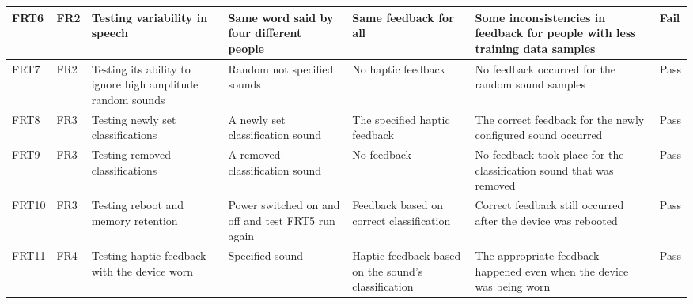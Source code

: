 \documentclass[12pt, titlepage]{article}
\begin{document}
\begin{longtable}{|p{1.4cm}|p{1cm}|p{3cm}|p{1.5cm}|p{2.5cm}|p{2cm}|p{1.2cm}|}
  FRT6        & FR2          & Testing variability in speech                                                & Same word said by four different people           & Same feedback for all                                       &          Some inconsistencies in feedback for people with less training data samples               &            {\color[HTML]{FE0000} Fail}                                        \\ \hline
  FRT7        & FR2          & Testing its ability to ignore high amplitude random sounds                   & Random not specified sounds                       & No haptic feedback                                          &          No feedback occurred for the random sound samples              &                     {\color[HTML]{32CB00} Pass}                               \\ \hline
  FRT8        & FR3          & Testing newly set classifications                                            & A newly set classification sound                  & The specified haptic feedback                               &          The correct feedback for the newly configured sound occurred              &                  {\color[HTML]{32CB00} Pass}                                  \\ \hline
  FRT9        & FR3          & Testing removed classifications                                              & A removed classification sound                    & No feedback                                                 &          No feedback took place for the classification sound that was removed              &            {\color[HTML]{32CB00} Pass}                                        \\ \hline
  FRT10       & FR3          & Testing reboot and memory retention                                          & Power switched on and off and test FRT5 run again & Feedback based on correct classification                    &          Correct feedback still occurred after the device was rebooted              &               {\color[HTML]{32CB00} Pass}                                     \\ \hline
  FRT11       & FR4          & Testing haptic feedback with the device worn                                 & Specified sound                                   & Haptic feedback based on the sound's classification         &          The appropriate feedback happened even when the device was being worn              &                   {\color[HTML]{32CB00} Pass}                                 \\ \hline

\end{longtable}
\end{document}
